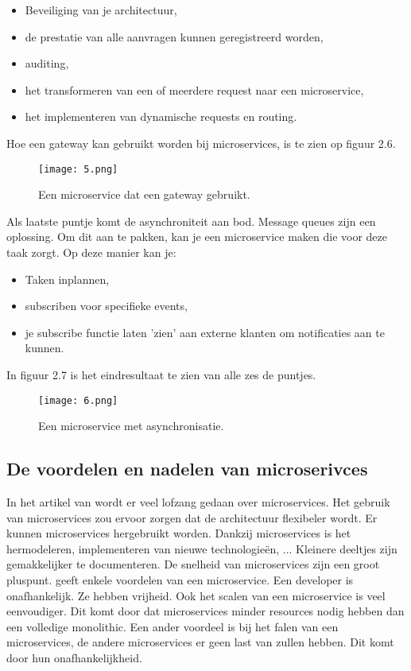 \begin{itemize}
	\item Beveiliging van je architectuur,
	\item de prestatie van alle aanvragen kunnen geregistreerd worden,
	\item auditing, 
	\item het transformeren van een of meerdere request naar een microservice,
	\item het implementeren van dynamische requests en routing.
\end{itemize}
Hoe een gateway kan gebruikt worden bij microservices, is te zien op figuur 2.6.
\begin{figure}[h]
	\texttt{[image: 5.png]}
	\caption{Een microservice dat een gateway gebruikt.}
	\centering
\end{figure}
Als laatste puntje komt de asynchroniteit aan bod. Message queues zijn een oplossing. Om dit aan te pakken, kan je een microservice maken die voor deze taak zorgt. Op deze manier kan je:
\begin{itemize}
	\item Taken inplannen,
	\item subscriben voor specifieke events,
	\item je subscribe functie laten 'zien' aan externe klanten om notificaties aan te kunnen.
\end{itemize}
In figuur 2.7 is het eindresultaat te zien van alle zes de puntjes.
\begin{figure}[h]
	\texttt{[image: 6.png]}
	\caption{Een microservice met asynchronisatie.}
	\centering
\end{figure}


\subsection{De voordelen en nadelen van microserivces}
In het artikel van \textcite{series2018} wordt er veel lofzang gedaan over microservices. Het gebruik van microservices zou ervoor zorgen dat de architectuur flexibeler wordt. Er kunnen microservices hergebruikt worden. Dankzij microservices is het hermodeleren, implementeren van nieuwe technologieën, ... 
Kleinere deeltjes zijn gemakkelijker te documenteren. De snelheid van microservices zijn een groot pluspunt.
\textcite{Watts2018} geeft enkele voordelen van een microservice. Een developer is onafhankelijk. Ze hebben vrijheid. Ook het scalen van een microservice is veel eenvoudiger. Dit komt door dat microservices minder resources nodig hebben dan een volledige monolithic. Een ander voordeel is bij het falen van een microservices, de andere microservices er geen last van zullen hebben. Dit komt door hun onafhankelijkheid. 
